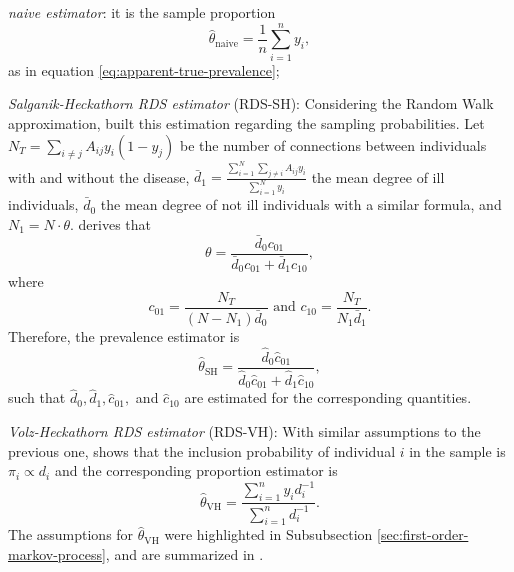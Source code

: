 \begin{alineas}
  \item {\em naive estimator}: it is the sample proportion 
  \begin{equation*}
    \hat{\theta}_{\mathrm{naive}} = \frac{1}{n}\sum_{i=1}^n y_i,
  \end{equation*} 
  as in equation \eqref{eq:apparent-true-prevalence}; 

  \item {\em Salganik-Heckathorn RDS
  estimator} (RDS-SH): Considering the Random Walk
  approximation, \textcite{salganik2004sampling} built this estimation
  regarding the sampling probabilities. Let $N_T = \sum_{i \neq j} A_{ij}y_i(1-
  y_j)$ be the number of connections between individuals with and without the
  disease, $\bar{d}_1 = \frac{\sum_{i=1}^N \sum_{j \neq i}
  A_{ij}y_i}{\sum_{i=1}^N y_i}$ the mean degree of ill individuals,
  $\bar{d}_0$ the mean degree of not ill individuals with a similar formula,
  and $N_1 = N\cdot\theta$. \textcite[p. 218]{salganik2004sampling} derives that 
  \begin{equation*}
    \theta = \frac{\bar{d}_0 c_{01}}{\bar{d}_0 c_{01} + \bar{d}_1 c_{10}},
  \end{equation*}
  where 
  \begin{equation*}
    c_{01} = \frac{N_T}{(N - N_1)\bar{d}_0} \text{ and } c_{10} = \frac{N_T}{N_1\bar{d}_1}.
  \end{equation*}
  Therefore, the prevalence estimator is
  \begin{equation}
    \label{eq:salganik-estimator}
    \hat{\theta}_{\mathrm{SH}} = \frac{\widehat{d}_0 \hat{c}_{01}}{\widehat{d}_0 \hat{c}_{01} + \widehat{d}_1 \hat{c}_{10}},
  \end{equation}
  such that $\widehat{d}_0, \widehat{d}_1,
  \hat{c}_{01},$ and $\hat{c}_{10}$ are estimated for the corresponding quantities. 

  \item {\em Volz-Heckathorn RDS estimator} (RDS-VH): With similar assumptions to the
  previous one, \textcite[p. 85]{volz2008probability} shows that the inclusion
   probability of individual $i$ in the sample is $\pi_i \propto
  d_i$ and the corresponding proportion estimator is  
  \begin{equation}
    \hat{\theta}_{\mathrm{VH}} = \frac{\sum_{i=1}^n y_i d_i^{-1}}{\sum_{i=1}^n d_i^{-1}}.
  \end{equation}
  The assumptions for $\hat{\theta}_{\mathrm{VH}}$ were highlighted in Subsubsection
  \ref{sec:first-order-markov-process}, and are summarized in \cite[Table
  1][p. 71]{gile2018methods}. 
  

\end{alineas}
